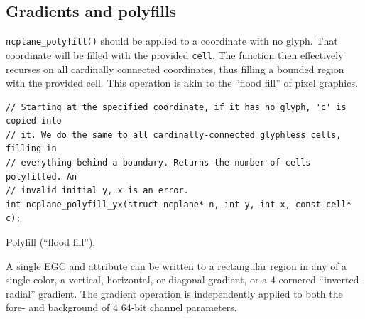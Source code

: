 \documentclass[letterpaper,10pt]{article}
\begin{document}
\subsection{Gradients and polyfills}
\texttt{ncplane\_polyfill()} should be applied to a coordinate with no glyph.
That coordinate will be filled with the provided \texttt{cell}. The function
then effectively recurses on all cardinally connected coordinates, thus filling
a bounded region with the provided cell. This operation is akin to the ``flood
fill'' of pixel graphics.

\begin{listing}[!htbp]
\begin{verbatim}
// Starting at the specified coordinate, if it has no glyph, 'c' is copied into
// it. We do the same to all cardinally-connected glyphless cells, filling in
// everything behind a boundary. Returns the number of cells polyfilled. An
// invalid initial y, x is an error.
int ncplane_polyfill_yx(struct ncplane* n, int y, int x, const cell* c);
\end{verbatim}
\caption{Polyfill (``flood fill'').}
\label{list:polyfill}
\end{listing}

A single EGC and attribute can be written to a rectangular region in any of
a single color, a vertical, horizontal, or diagonal gradient, or a 4-cornered
``inverted radial'' gradient. The gradient operation is independently applied
to both the fore- and background of 4 64-bit channel parameters.
\end{document}
